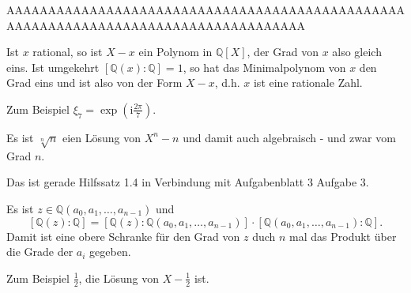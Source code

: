 \documentclass{algsheet}
\begin{document}
AAAAAAAAAAAAAAAAAAAAAAAAAAAAAAAAAAAAAAAAAAAAAAAAAAAAAAAAAAAAAAAAAAAAAAAAAAAAAAAAAAAA



\begin{exercise}
 Ist $x$ rational, so ist $X-x$ ein Polynom in $\mathbb Q[X]$, der Grad von $x$ also gleich eins.
\newline
Ist umgekehrt $[\mathbb Q(x):\mathbb Q]=1$, so hat das Minimalpolynom von $x$ den Grad eins und ist also von der Form $X-x$,
d.h. $x$ ist eine rationale Zahl. 
\end{exercise}



\begin{exercise}
  Zum Beispiel $\xi_7=\exp(\mathrm i\frac{2\pi}{7})$.
\end{exercise}




\begin{exercise}
 Es ist $\sqrt[n]{n}$ eien Lösung von $X^n-n$  und damit auch algebraisch - und zwar vom Grad $n$.
 
\end{exercise}



\begin{exercise}
 Das ist gerade Hilfssatz 1.4 in Verbindung mit Aufgabenblatt 3 Aufgabe 3.
\end{exercise}


\begin{exercise}
Es ist $z\in\mathbb Q(a_0,a_1,\dots,a_{n-1})$ und
\[[\mathbb Q(z)\colon\mathbb Q]=[\mathbb Q(z)\colon\mathbb Q(a_0,a_1,\dots,a_{n-1})]\cdot
    [\mathbb Q(a_0,a_1,\dots,a_{n-1})\colon\mathbb Q].\]
Damit ist eine obere Schranke für den Grad von $z$ duch $n$ mal das Produkt über die Grade der $a_i$ gegeben.
\end{exercise}


\begin{exercise}
 Zum Beispiel $\frac12$, die Lösung von $X-\frac12$ ist.
\end{exercise}
\end{document}
